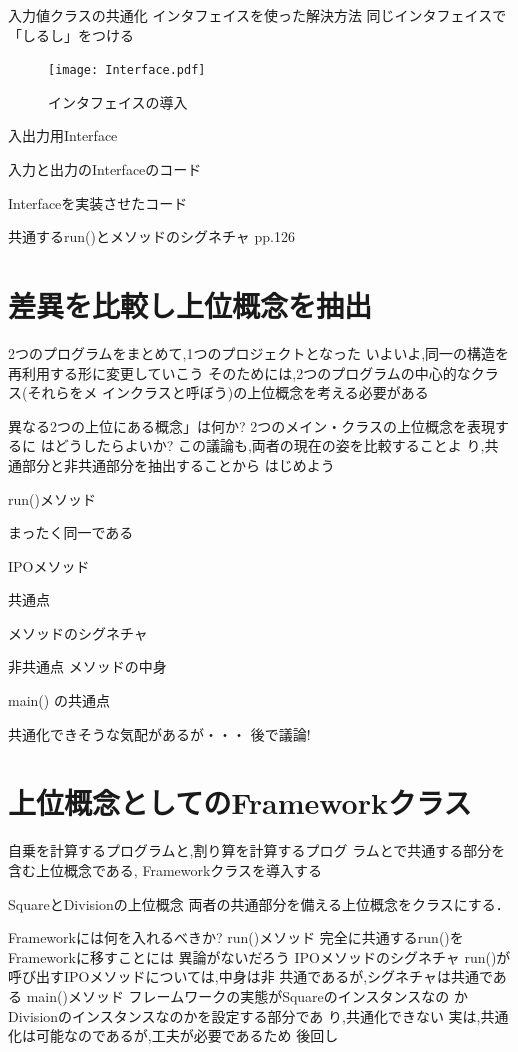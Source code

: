\documentclass[a4j, twoside]{jsbook}
\begin{document}
入力値クラスの共通化
インタフェイスを使った解決方法
 同じインタフェイスで「しるし」をつける


\begin{figure}
 \begin{center}
  \texttt{[image: Interface.pdf]}
  \caption{インタフェイスの導入}
 \end{center}
\end{figure}

入出力用Interface

入力と出力のInterfaceのコード

Interfaceを実装させたコード

共通するrun()とメソッドのシグネチャ
pp.126

\section{差異を比較し上位概念を抽出}

2つのプログラムをまとめて,1つのプロジェクトとなった
いよいよ,同一の構造を再利用する形に変更していこう
そのためには,2つのプログラムの中心的なクラス(それらをメ
インクラスと呼ぼう)の上位概念を考える必要がある

異なる2つの上位にある概念」は何か?
2つのメイン・クラスの上位概念を表現するに
はどうしたらよいか?
この議論も,両者の現在の姿を比較することよ
り,共通部分と非共通部分を抽出することから
はじめよう

run()メソッド

 まったく同一である

IPOメソッド

 共通点

 メソッドのシグネチャ

 非共通点
 メソッドの中身

main() の共通点

共通化できそうな気配があるが・・・
後で議論!

\section{上位概念としてのFrameworkクラス}

自乗を計算するプログラムと,割り算を計算するプログ
ラムとで共通する部分を含む上位概念である,
Frameworkクラスを導入する

SquareとDivisionの上位概念
両者の共通部分を備える上位概念をクラスにする．

Frameworkには何を入れるべきか?
run()メソッド
 完全に共通するrun()をFrameworkに移すことには
異論がないだろう
IPOメソッドのシグネチャ
 run()が呼び出すIPOメソッドについては,中身は非
共通であるが,シグネチャは共通である
main()メソッド
 フレームワークの実態がSquareのインスタンスなの
かDivisionのインスタンスなのかを設定する部分であ
り,共通化できない
 実は,共通化は可能なのであるが,工夫が必要であるため
後回し
\end{document}
